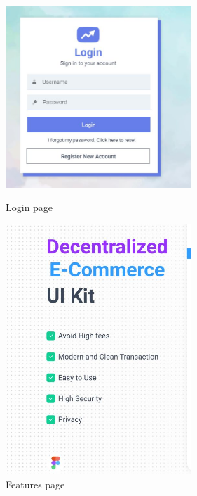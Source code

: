 \documentclass{report}
\begin{document}
\begin{figure}[h]
    \centering
    
    \begin{minipage}{0.45\textwidth}
    \centering
    \includegraphics[width=7cm]{evaluation/01.jpeg}
    \caption{Login page}
    \label{fig:1}
    \end{minipage}
    \hfill
    \begin{minipage}{0.45\textwidth}
    \centering
    \includegraphics[width=7cm]{evaluation/02.jpeg}
    \caption{Features page}
    \label{fig:2}
    \end{minipage}  
\end{figure}
\end{document}
